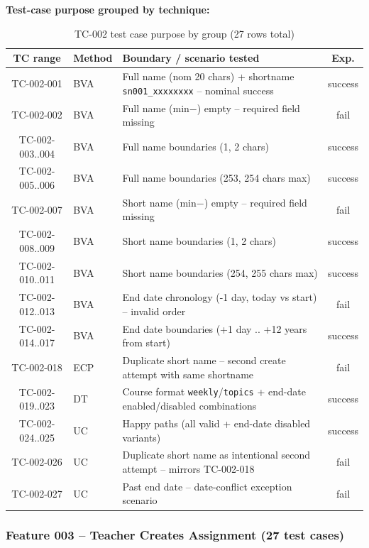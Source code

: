 \documentclass[twoside,final]{hcmut-report}
\begin{document}
\textbf{Test-case purpose grouped by technique:}
\begin{table}[H]
\centering
\renewcommand{\arraystretch}{1.2}
\begin{tabularx}{\textwidth}{|c|l|X|c|}
\hline
\textbf{TC range} & \textbf{Method} & \textbf{Boundary / scenario tested} & \textbf{Exp.} \\ \hline
TC-002-001 & BVA & Full name (nom 20 chars) + shortname \texttt{sn001\_xxxxxxxx} -- nominal success & success \\ \hline
TC-002-002 & BVA & Full name (min$-$) empty -- required field missing & fail \\ \hline
TC-002-003..004 & BVA & Full name boundaries (1, 2 chars) & success \\ \hline
TC-002-005..006 & BVA & Full name boundaries (253, 254 chars max) & success \\ \hline
TC-002-007 & BVA & Short name (min$-$) empty -- required field missing & fail \\ \hline
TC-002-008..009 & BVA & Short name boundaries (1, 2 chars) & success \\ \hline
TC-002-010..011 & BVA & Short name boundaries (254, 255 chars max) & success \\ \hline
TC-002-012..013 & BVA & End date chronology (-1 day, today vs start) -- invalid order & fail \\ \hline
TC-002-014..017 & BVA & End date boundaries (+1 day .. +12 years from start) & success \\ \hline
TC-002-018 & ECP & Duplicate short name -- second create attempt with same shortname & fail \\ \hline
TC-002-019..023 & DT & Course format \texttt{weekly}/\texttt{topics} + end-date enabled/disabled combinations & success \\ \hline
TC-002-024..025 & UC & Happy paths (all valid + end-date disabled variants) & success \\ \hline
TC-002-026 & UC & Duplicate short name as intentional second attempt -- mirrors TC-002-018 & fail \\ \hline
TC-002-027 & UC & Past end date -- date-conflict exception scenario & fail \\ \hline
\end{tabularx}
\caption{TC-002 test case purpose by group (27 rows total)}
\end{table}

\subsubsection{Feature 003 -- Teacher Creates Assignment (27 test cases)}
\end{document}
